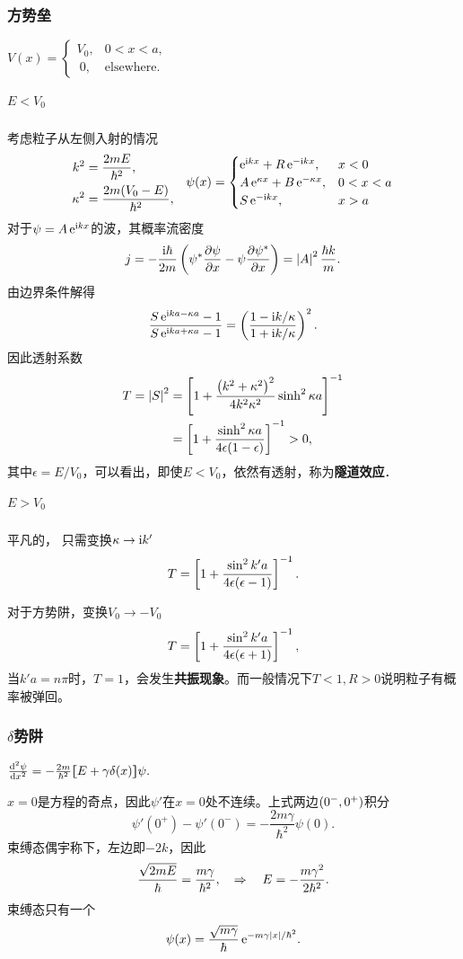\subsubsection*{方势垒}
\begin{center}
	$V(x)=\begin{cases}
			V_0, & 0<x<a,            \\
			~0,  & \text{elsewhere.}
		\end{cases}$
\end{center}
\subparagraph*{$E<V_0$}考虑粒子从左侧入射的情况
\begin{align*}
	\begin{aligned}
		k^2      & =\frac{2mE}{\hbar^2},       \\
		\kappa^2 & =\frac{2m(V_0-E)}{\hbar^2},
	\end{aligned}\quad
	\psi(x)=\begin{cases}
		\e{\i kx}+R\e{-\i kx},        & x<0   \\
		A\e{\kappa x}+B\e{-\kappa x}, & 0<x<a \\
		S\e{-\i kx},                  & x>a
	\end{cases}
\end{align*}
对于$\psi=A\e{\i kx}$的波，其概率流密度
\[
	j=-\frac{\i\hbar}{2m}\kh{\psi^*\pv\psi{x}-\psi\pv{\psi^*}x}=\abs{A}^2\frac{\hbar k}m.
\]
由边界条件解得
\[
	\frac{S\e{\i ka-\kappa a}-1}{S\e{\i ka+\kappa a}-1}=\kh{\frac{1-\i k/\kappa}{1+\i k/\kappa}}^2.
\]
因此透射系数
\begin{align}\notag
	T=\abs{S}^2 & =\fkh{1+\frac{\kh{k^2+\kappa^2}^2}{4k^2\kappa^2}\sinh^2\kappa a}^{-1} \\
	            & =\fkh{1+\frac{\sinh^2\kappa a}{4\epsilon(1-\epsilon)}}^{-1}>0,
\end{align}
其中$\epsilon=E/V_0$，可以看出，即使$E<V_0$，依然有透射，称为\textbf{隧道效应}．
\subparagraph*{$E>V_0$}平凡的，
只需变换$\kappa\to\i k'$
\[
	T=\fkh{1+\frac{\sin^2k'a}{4\epsilon(\epsilon-1)}}^{-1}.
\]

对于方势阱，变换$V_0\to-V_0$
\[
	T=\fkh{1+\frac{\sin^2k'a}{4\epsilon(\epsilon+1)}}^{-1},
\]
当$k'a=n\pi$时，$T=1$，会发生\textbf{共振现象}。而一般情况下$T<1,R>0$说明粒子有概率被弹回。
\subsubsection*{$\delta$势阱}
\begin{center}
	$\dv[2]\psi{x}=-\frac{2m}{\hbar^2}\zkh{E+\gamma\delta(x)}\psi.$
\end{center}
$x=0$是方程的奇点，因此$\psi'$在$x=0$处不连续。上式两边$\kh{0^-,0^+}$积分
\[
	\psi'(0^+)-\psi'(0^-)=-\frac{2m\gamma}{\hbar^2}\psi(0).
\]
束缚态偶宇称下，左边即$-2k$，因此
\begin{align}
	\frac{\sqrt{2mE}}\hbar=\frac{m\gamma}{\hbar^2},\thus E=-\frac{m\gamma^2}{2\hbar^2}.
\end{align}
束缚态只有一个
\begin{align}
	\psi(x)=\frac{\sqrt{m\gamma}}\hbar\e{-m\gamma\abs{x}/\hbar^2}.
\end{align}
